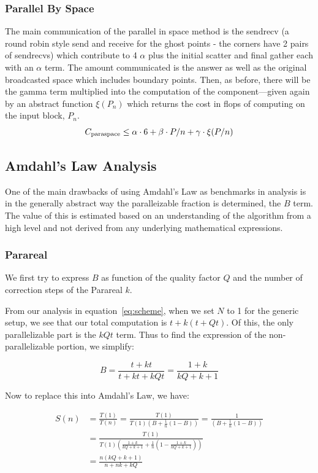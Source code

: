 \documentclass[letterpaper,12pt]{article}
\begin{document}
\subsubsection{Parallel By Space}
The main communication of the parallel in space method is the sendrecv (a round
robin style send and receive for the ghost points - the corners have 2 pairs of
sendrecvs) which contribute to 4 $\alpha$ plus the initial scatter and final
gather each with an $\alpha$ term. The amount communicated is the answer as well
as the original broadcasted space which includes boundary points. Then, as
before, there will be the gamma term multiplied into the computation of the
component---given again by an abstract function $\xi(P_n)$ which returns the
cost in flops of computing on the input block, $P_n$. 
\[
C_{\textnormal{paraspace}} \leq \alpha \cdot 6 + \beta \cdot P/n + \gamma \cdot \xi(P/n)
\]

\subsection{Amdahl's Law Analysis}

One of the main drawbacks of using Amdahl's Law as benchmarks in analysis is in the generally abstract way the paralleizable fraction is determined, the $B$ term. The value of this is estimated based on an understanding of the algorithm from a high level and not derived from any underlying mathematical expressions.

\subsubsection{Parareal}

We first try to express $B$ as function of the quality factor $Q$ and the number of correction steps of the Parareal $k$.

From our analysis in equation~\ref{eq:scheme}, when we set $N$ to 1 for the generic setup, we see that our total computation is $t + k(t+ Qt)$. Of this, the only parallelizable part is the $kQt$ term. Thus to find the expression of the non-parallelizable portion, we simplify:

\[
B = \frac{t+kt}{t+kt+kQt} = \frac{1+k}{kQ+k+1}
\]

Now to replace this into Amdahl's Law, we have:

\[
\begin{aligned}
S(n) &= \frac{T(1)}{T(n)} = \frac{T(1)}{ T(1) \left( B + \frac{1}{n} (1-B) \right)} = \frac{1}{\left( B + \frac{1}{n} (1-B) \right)}\\
       &= \frac{T(1)}{T(1) \left( \frac{1+k}{kQ+k+1} + \frac{1}{n} (1- \frac{1+k}{kQ+k+1}) \right)} \\
       &= \frac{n(kQ+k+1)}{n+nk+kQ}
\end{aligned}
\]
\end{document}
